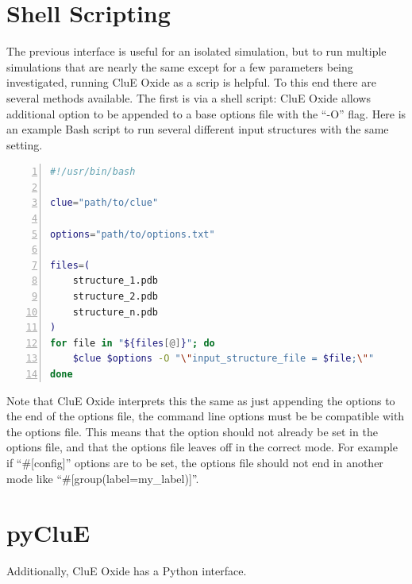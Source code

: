 \documentclass{book}
\begin{document}
\section{Shell Scripting}
The previous interface is useful for an isolated simulation, 
but to run multiple simulations that are nearly the same except for a few
parameters being investigated, running CluE Oxide as a scrip is helpful.  
To this end there are several methods available.
The first is via a shell script: CluE Oxide allows additional option to be appended
to a base options file with the ``-O'' flag.  
Here is an example  Bash script to run several different input structures
with the same setting.
\begin{lstlisting}[frame=single,numbers=left,language=bash]
#!/usr/bin/bash

clue="path/to/clue"

options="path/to/options.txt"

files=( 
    structure_1.pdb
    structure_2.pdb
    structure_n.pdb
)
for file in "${files[@]}"; do
    $clue $options -O "\"input_structure_file = $file;\""
done
\end{lstlisting}
Note that CluE Oxide interprets this the same as just appending 
the options to the end of the options file,
the command line options must be be compatible with the options file.
This means that the option should not already be set in the options file,
and that the options file leaves off in the correct mode.
For example if ``\#[config]'' options are to be set, the options file should
not end in another mode like ``\#[group(label=my\_label)]''.

\section{pyCluE}
Additionally, CluE Oxide has a Python interface.
\end{document}

